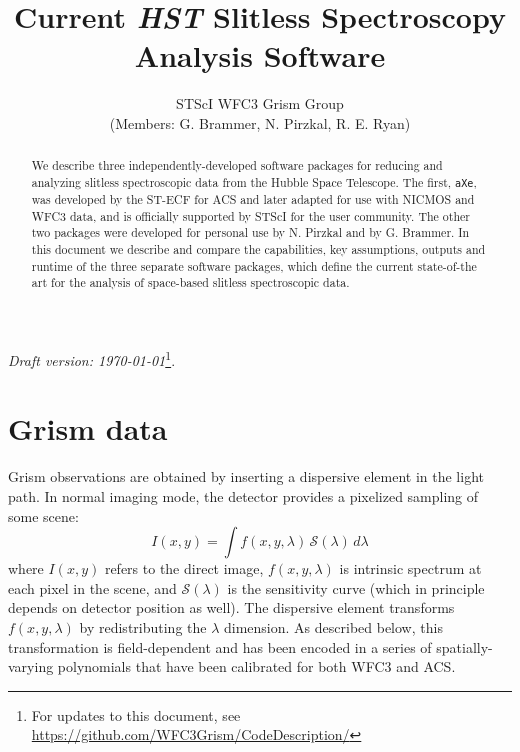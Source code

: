 \documentclass[preprint]{aastex}
\begin{document}
\title{Current \textit{HST} Slitless Spectroscopy Analysis Software}

\author{STScI WFC3 Grism Group \\ (Members: G. Brammer, N. Pirzkal, R. E. Ryan)}

\begin{abstract}
    
    We describe three independently-developed software packages for reducing and analyzing slitless spectroscopic data from the Hubble Space Telescope.  The first, \texttt{aXe}, was developed by the ST-ECF for ACS and later adapted for use with NICMOS and WFC3 data,  and is officially supported by STScI for the user community.  The other two packages were developed for personal use by N. Pirzkal and by G. Brammer.  In this document we describe and compare the capabilities, key assumptions, outputs and runtime of the three separate software packages, which define the current state-of-the art for the analysis of space-based slitless spectroscopic data.
    
\end{abstract}

\textit{Draft version: \today}\footnote{For updates to this document, see
\url{https://github.com/WFC3Grism/CodeDescription/}}.

\section{Grism data}




Grism observations are obtained by inserting a dispersive element in the light path.  In normal imaging mode, the detector provides a pixelized sampling of some scene:
\begin{dmath}
I(x,y) = \int f(x,y,\lambda)\,\mathcal{S}(\lambda)\,d\lambda
\end{dmath}
where $I(x,y)$ refers to the direct image, $f(x,y,\lambda)$ is intrinsic spectrum at each pixel in the scene, and $\mathcal{S}(\lambda)$ is the sensitivity curve (which in principle depends on detector position as well). The dispersive element transforms $f(x,y,\lambda)$ by redistributing the $\lambda$ dimension.  As described below, this transformation is field-dependent and has been encoded in a series of spatially-varying polynomials that have been calibrated for both WFC3 and ACS.
\end{document}
